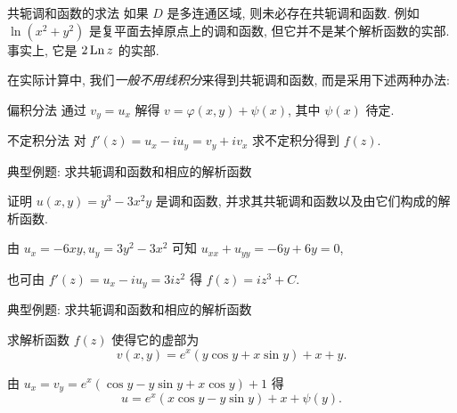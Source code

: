 \begin{frame}{共轭调和函数的求法}
\onslide<+->
如果 $D$ 是多连通区域, 则未必存在共轭调和函数.
\onslide<+->
例如 $\ln(x^2+y^2)$ 是复平面去掉原点上的调和函数, 但它并不是某个解析函数的实部.
\onslide<+->
事实上, 它是 $2\operatorname{Ln} z$ 的实部.

\onslide<+->
在实际计算中, 我们\emph{一般不用线积分}来得到共轭调和函数, 而是采用下述两种办法:
\onslide<+->
\begin{alertblock}{偏积分法}
通过 $v_y=u_x$ 解得 $v=\varphi(x,y)+\psi(x)$, 其中 $\psi(x)$ 待定.
\end{alertblock}
\onslide<+->
\begin{alertblock}{不定积分法}
对 $f'(z)=u_x-iu_y=v_y+iv_x$ 求不定积分得到 $f(z)$.
\end{alertblock}
\end{frame}


\begin{frame}{典型例题: 求共轭调和函数和相应的解析函数}
\onslide<+->
\begin{example}
证明 $u(x,y)=y^3-3x^2y$ 是调和函数, 并求其共轭调和函数以及由它们构成的解析函数.
\end{example}
\onslide<+->
\begin{solution}
由 $u_x=-6xy,u_y=3y^2-3x^2$ 可知 $u_{xx}+u_{yy}=-6y+6y=0$,

\vspace{-\baselineskip}
\end{solution}
\onslide<+->
也可由 $f'(z)=u_x-iu_y=3iz^2$ 得 $f(z)=iz^3+C$.
\end{frame}


\begin{frame}{典型例题: 求共轭调和函数和相应的解析函数}
\onslide<+->
\begin{example}
求解析函数 $f(z)$ 使得它的虚部为
\[v(x,y)=e^x(y\cos y+x\sin y)+x+y.\]
\end{example}
\onslide<+->
\begin{solution}
由 $u_x=v_y=e^x(\cos y-y\sin y+x\cos y)+1$ 得
\[u=e^x(x\cos y-y\sin y)+x+\psi(y).\]
\vspace{-\baselineskip}
\end{solution}
\end{frame}


